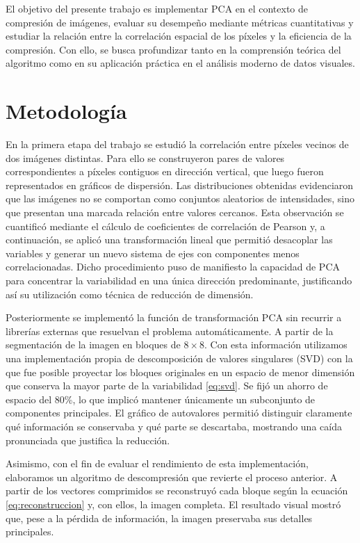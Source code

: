 \documentclass[12pt]{article}
\begin{document}
El objetivo del presente trabajo es implementar PCA en el contexto de compresión de imágenes, evaluar su desempeño mediante métricas cuantitativas y estudiar la relación entre la correlación espacial de los píxeles y la eficiencia de la compresión. Con ello, se busca profundizar tanto en la comprensión teórica del algoritmo como en su aplicación práctica en el análisis moderno de datos visuales.

\section{Metodología}

En la primera etapa del trabajo se estudió la correlación entre píxeles vecinos de dos imágenes distintas. Para ello se construyeron pares de valores correspondientes a píxeles contiguos en dirección vertical, que luego fueron representados en gráficos de dispersión. Las distribuciones obtenidas evidenciaron que las imágenes no se comportan como conjuntos aleatorios de intensidades, sino que presentan una marcada relación entre valores cercanos. Esta observación se cuantificó mediante el cálculo de coeficientes de correlación de Pearson y, a continuación, se aplicó una transformación lineal que permitió desacoplar las variables y generar un nuevo sistema de ejes con componentes menos correlacionadas. Dicho procedimiento puso de manifiesto la capacidad de PCA para concentrar la variabilidad en una única dirección predominante, justificando así su utilización como técnica de reducción de dimensión.

Posteriormente se implementó la función de transformación PCA sin recurrir a librerías externas que resuelvan el problema automáticamente. A partir de la segmentación de la imagen en bloques de $8\times 8$. Con esta información utilizamos una implementación propia de descomposición de valores singulares (SVD) con la que fue posible proyectar los bloques originales en un espacio de menor dimensión que conserva la mayor parte de la variabilidad \eqref{eq:svd}. Se fijó un ahorro de espacio del 80\%, lo que implicó mantener únicamente un subconjunto de componentes principales. El gráfico de autovalores permitió distinguir claramente qué información se conservaba y qué parte se descartaba, mostrando una caída pronunciada que justifica la reducción.

Asimismo, con el fin de evaluar el rendimiento de esta implementación, elaboramos un algoritmo de descompresión que revierte el proceso anterior. A partir de los vectores comprimidos se reconstruyó cada bloque según la ecuación \eqref{eq:reconstruccion} y, con ellos, la imagen completa. El resultado visual mostró que, pese a la pérdida de información, la imagen preservaba sus detalles principales.
\end{document}
